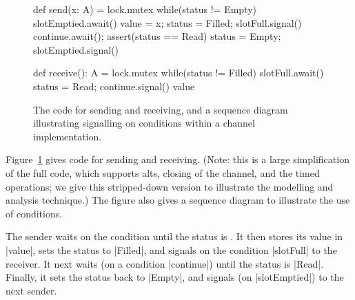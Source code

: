\begin{figure}
\begin{minipage}[t]{80mm}
\begin{scala}
def send(x: A) = lock.mutex{
  while(status != Empty) slotEmptied.await()
  value = x; status = Filled; slotFull.signal()
  continue.await(); assert(status == Read)
  status = Empty; slotEmptied.signal()
}
\end{scala}
\end{minipage}
%
\begin{minipage}[t]{75mm}
\begin{scala}
def receive(): A = lock.mutex{
  while(status != Filled) slotFull.await()
  status = Read; continue.signal()
  value
}
\end{scala}
\end{minipage}


\begin{center}
\def\rx{3} %
\def\height{4}  %
\def\delta{0.8} %
\end{center}
\caption{The code for sending and receiving, and a sequence diagram
  illustrating signalling on conditions within a channel
  implementation. \label{fig:channel-sd}}
\end{figure}


Figure~\ref{fig:channel-sd} gives code for sending and receiving.  (Note: this
is a large simplification of the full code, which supports alts, closing of
the channel, and the timed operations; we give this stripped-down version to
illustrate the modelling and analysis technique.)  The figure also gives a
sequence diagram to illustrate the use of conditions.

The sender waits on the condition  until the status is
.  It then stores its value in |value|, sets the status to
|Filled|, and signals on the condition |slotFull| to the receiver.  It next 
waits (on a condition |continue|) until the status is |Read|.  Finally, it
sets the status back to |Empty|, and signals (on |slotEmptied|) to the next
sender.

